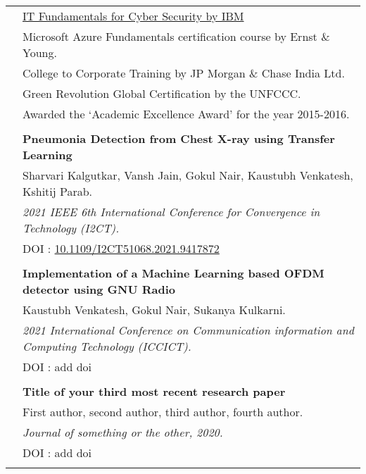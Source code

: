 \documentclass[letterpaper, 11pt]{article}
\begin{document}
\begin{longtable}{p{1.3in}p{4.8in}}

{\color{OliveGreen}{Awards and}} 
& \href{https://coursera.org/share/873ac303647846970ff59ac138eee553}{IT Fundamentals for Cyber Security by IBM}\\
{\color{OliveGreen}{Certifications}} 
& Microsoft Azure Fundamentals certification course by Ernst \& Young.\\
& College to Corporate Training by JP Morgan \& Chase India Ltd. \\
& Green Revolution Global Certification by the UNFCCC.\\
& Awarded the ‘Academic Excellence Award’ for the year 2015-2016. \\
& \\

\nohyphens{\color{OliveGreen}{Publications}} 
& \textbf{Pneumonia Detection from Chest X-ray using Transfer Learning} \\
& Sharvari Kalgutkar, Vansh Jain, Gokul Nair, Kaustubh Venkatesh, Kshitij Parab. \\
& \textit{2021 IEEE 6th International Conference for Convergence in Technology (I2CT).}\\
& DOI : \href{https://ieeexplore.ieee.org/document/9417872}{10.1109/I2CT51068.2021.9417872}\\
\\

& \textbf{Implementation of a Machine Learning based OFDM detector using GNU Radio} \\
& Kaustubh Venkatesh, Gokul Nair, Sukanya Kulkarni. \\
& \textit{2021 International Conference on Communication information and Computing Technology (ICCICT).}\\
& DOI : add doi \\
& \\

& \textbf{Title of your third most recent research paper} \\
& First author, second author, third author, fourth author. \\
& \textit{Journal of something or the other, 2020.}\\
& DOI : add doi \\
& \\



\end{longtable}
\end{document}
